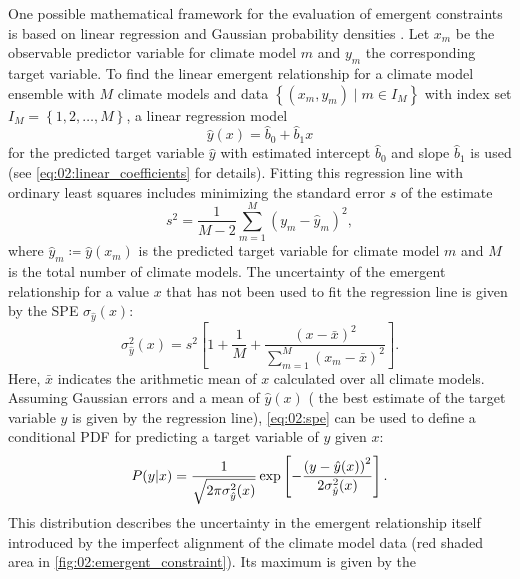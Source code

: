 One possible mathematical framework for the evaluation of emergent constraints
is based on linear regression and Gaussian probability densities
\autocite{Cox2013, Cox2018}. Let $x_m$ be the observable predictor variable for
climate model $m$ and $y_m$ the corresponding target variable. To find the
linear emergent relationship for a climate model ensemble with $M$ climate
models and data $\left\{ \left( x_m, y_m \right) \mid m \in I_M \right\}$ with
index set $I_M = \left\{ 1, 2, \ldots, M \right\}$, a linear
regression model
\begin{equation}
  \hat{y}(x) = \hat{b}_0 + \hat{b}_1 x
  \label{eq:02:linear_regression_y}
\end{equation}
for the predicted target variable $\hat{y}$ with estimated intercept
$\hat{b}_0$ and slope $\hat{b}_1$ is used (see \cref{eq:02:linear_coefficients}
for details). Fitting this regression line with ordinary least squares includes
minimizing the standard error $s$ of the estimate
\begin{equation}
  s^2 = \frac{1}{M - 2} \sum_{m=1}^M \left( y_m - \hat{y}_m \right)^2,
  \label{eq:02:sse}
\end{equation}
where $\hat{y}_m \coloneq \hat{y}(x_m)$ is the predicted target variable for
climate model $m$ and $M$ is the total number of climate models. The
uncertainty of the emergent relationship for a value $x$ that has not been used
to fit the regression line is given by the \ac{SPE} $\sigma_{\hat{y}}(x)$:
\begin{equation}
  \sigma_{\hat{y}}^2(x) = s^2 \left[ 1 + \frac{1}{M} + \frac{\left( x - \bar{x}
    \right)^2}{\sum_{m=1}^M \left( x_m - \bar{x} \right)^2} \right].
  \label{eq:02:spe}
\end{equation}
Here, $\bar{x}$ indicates the arithmetic mean of $x$ calculated over all
climate models. Assuming Gaussian errors and a mean of $\hat{y}(x)$ (\ie{} the
best estimate of the target variable $y$ is given by the regression line),
\cref{eq:02:spe} can be used to define a conditional \acf{PDF} for predicting a
target variable of $y$ given $x$:
\begin{equation}
  P(y|x) = \frac{1}{\sqrt{2 \pi \sigma_{\hat{y}}^2(x)}} \exp \left[
    -\frac{\left( y - \hat{y}(x) \right)^2}{2 \sigma_{\hat{y}}^2(x)} \right].
  \label{eq:02:pdf_y_given_x}
\end{equation}
This distribution describes the uncertainty in the emergent relationship itself
introduced by the imperfect alignment of the climate model data (red shaded
area in \cref{fig:02:emergent_constraint}). Its maximum is given by the
